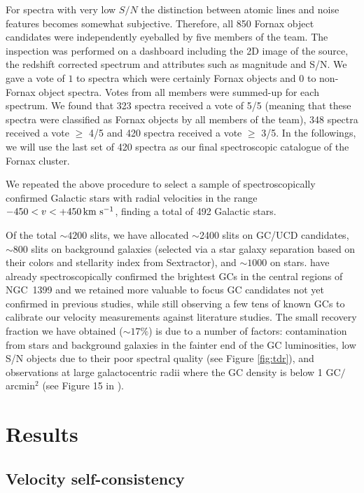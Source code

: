 \documentclass[useAMS,usenatbib]{mn2e}
\newcommand{\kms}{\mbox{\,km~s$^{-1}$}}
\begin{document}
For spectra with very low $S/N$ the distinction between atomic lines and noise 
features becomes somewhat subjective. Therefore, all 850 Fornax object 
candidates were independently eyeballed by five members of the team. The 
inspection was performed on a dashboard including the 2D image of the source, 
the redshift corrected spectrum and attributes such as magnitude and S/N. We 
gave a vote of $1$ to spectra which were certainly Fornax objects and $0$ to 
non-Fornax object spectra. Votes from all members were summed-up for each spectrum. 
We found that 323 spectra received a vote of 5/5 
(meaning that these spectra were classified as Fornax objects by all members of 
the team), 348 spectra received a vote $\ge$ 4/5 and 420 spectra received a vote 
$\ge$ 3/5. In the followings, we will use the last set of 420 spectra as our 
final spectroscopic catalogue of the Fornax cluster. 

We repeated the above procedure to select a sample of spectroscopically 
confirmed Galactic stars with radial velocities in the range $-450<v<+450 
\kms$, finding a total of 492 Galactic stars.

Of the total $\sim4200$ slits, we have allocated $\sim$2400 slits on GC/UCD candidates, 
$\sim 800$ slits on background galaxies (selected via a star galaxy separation 
based on their colors and stellarity index from Sextractor), and $\sim1000$ 
on stars. \citet{Schuberth} have already spectroscopically confirmed the brightest GCs
in the central regions of NGC~1399 and we retained more valuable to focus GC candidates 
not yet confirmed in previous studies, while still observing a few tens of known GCs to calibrate 
our velocity measurements against literature studies. The small recovery fraction we have 
obtained ($\sim 17\%$) is due to a number of factors: contamination
from stars and background galaxies in the fainter end of the GC 
luminosities, low S/N objects due to their poor spectral quality (see Figure \ref{fig:tdr}),
and observations at large galactocentric radii where the GC density is 
below 1 GC$/$ arcmin$^2$ (see Figure 15 in \citealt{Schuberth}). 

\section{Results}
\label{sec:analysis}
\subsection{Velocity self-consistency}
\end{document}
